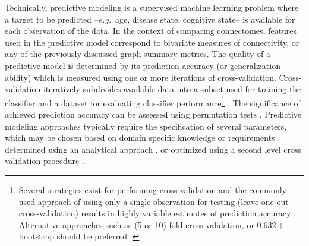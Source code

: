 \documentclass[5p]{elsarticle}
\begin{document}
Technically, predictive modeling is a supervised machine learning problem where
a target to be predicted --\emph{e.g.}\ age, disease state, cognitive state-- is
available for each observation of the data. In the context of comparing
connectomes, features used in the predictive model correspond to bivariate
measures of connectivity, or any of the previously discussed graph summary metrics.  
%
The quality of a predictive model is determined by its prediction accuracy (or
generalization ability) which is measured using one or more iterations of
cross-validation. Cross-validation iteratively subdivides available data into a
subset used for training the classifier and a dataset for evaluating classifier
performance\footnote{Several strategies exist for performing cross-validation and the commonly
used approach of using only a single observation for testing (leave-one-out
cross-validation) results in highly variable estimates of prediction accuracy
\cite{friedman2001}.
Alternative approaches such as (5 or 10)-fold cross-validation,
or $0.632+$ bootstrap should be preferred \cite{friedman2001}.} 
 \cite{pereira2009}.
The significance of
achieved prediction accuracy can be assessed using permutation tests
\cite{golland2003}.
Predictive modeling approaches typically require the specification of several
parameters, which may be chosen based on domain specific knowledge or
requirements \cite{cherkassky1998}, determined using an analytical approach
\cite{cherkassky2004}, or optimized using a second level cross validation procedure
\cite{friedman2001}.  
\end{document}
